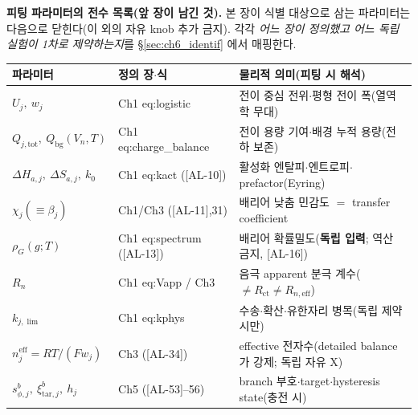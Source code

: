 \documentclass[11pt,a4paper]{article}
\newcommand{\eff}{\mathrm{eff}}
\newcommand{\bg}{\mathrm{bg}}
\newcommand{\tot}{\mathrm{tot}}
\newcommand{\ct}{\mathrm{ct}}
\newcommand{\tar}{\mathrm{tar}}
\newcommand{\AL}[1]{\textsf{[AL-#1]}}
\begin{document}
\textbf{피팅 파라미터의 전수 목록(앞 장이 남긴 것).} 본 장이 식별 대상으로 삼는 파라미터는 다음으로 닫힌다(이 외의
자유 knob 추가 금지). 각각 \emph{어느 장이 정의했고 어느 독립 실험이 1차로 제약하는지}를 \S\ref{sec:ch6_identif}
에서 매핑한다.
\begin{longtable}{p{} p{} p{}}
\toprule 파라미터 & 정의 장$\cdot$식 & 물리적 의미(피팅 시 해석) \\ \midrule \endhead
$U_j,\ w_j$ & Ch1 eq:logistic & 전이 중심 전위$\cdot$평형 전이 폭(열역학 무대) \\
$Q_{j,\tot},\ Q_\bg(V_n,T)$ & Ch1 eq:charge\_balance & 전이 용량 기여$\cdot$배경 누적 용량(전하 보존) \\
$\Delta H_{a,j},\ \Delta S_{a,j},\ k_0$ & Ch1 eq:kact (\AL{10}) & 활성화 엔탈피$\cdot$엔트로피$\cdot$prefactor(Eyring) \\
$\chi_j(\equiv\beta_j)$ & Ch1/Ch3 (\AL{11},31) & 배리어 낮춤 민감도 $=$ transfer coefficient \\
$\rho_G(g;T)$ & Ch1 eq:spectrum (\AL{13}) & 배리어 확률밀도(\textbf{독립 입력}; 역산 금지, \AL{16}) \\
$R_n$ & Ch1 eq:Vapp / Ch3 & 음극 apparent 분극 계수($\ne R_\ct\ne R_{n,\eff}$) \\
$k_{j,\lim}$ & Ch1 eq:kphys & 수송$\cdot$확산$\cdot$유한자리 병목(독립 제약 시만) \\
$n_j^{\eff}=RT/(Fw_j)$ & Ch3 (\AL{34}) & effective 전자수(detailed balance 가 강제; 독립 자유 X) \\
$s_{\phi,j}^b,\ \xi_{\tar,j}^b,\ h_j$ & Ch5 (\AL{53}--56) & branch 부호$\cdot$target$\cdot$hysteresis state(충전 시) \\
\bottomrule
\end{longtable}

\end{document}
